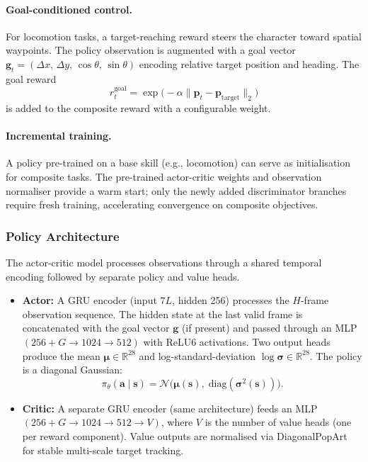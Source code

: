\paragraph{Goal-conditioned control.}
For locomotion tasks, a target-reaching reward steers the character toward spatial waypoints. The policy observation is augmented with a goal vector $\mathbf{g}_t = (\Delta x,\, \Delta y,\, \cos\theta,\, \sin\theta)$ encoding relative target position and heading. The goal reward
\[
    r_t^{\mathrm{goal}} = \exp\bigl(-\alpha \|\mathbf{p}_t - \mathbf{p}_{\mathrm{target}}\|_2\bigr)
\]
is added to the composite reward with a configurable weight.

\paragraph{Incremental training.}
A policy pre-trained on a base skill (e.g., locomotion) can serve as initialisation for composite tasks. The pre-trained actor-critic weights and observation normaliser provide a warm start; only the newly added discriminator branches require fresh training, accelerating convergence on composite objectives.


\subsubsection{Policy Architecture}
\label{sec:policy}

The actor-critic model processes observations through a shared temporal encoding followed by separate policy and value heads.

\begin{itemize}
    \item \textbf{Actor:} A GRU encoder (input $7L$, hidden 256) processes the $H$-frame observation sequence. The hidden state at the last valid frame is concatenated with the goal vector $\mathbf{g}$ (if present) and passed through an MLP $(256{+}G \to 1024 \to 512)$ with ReLU6 activations. Two output heads produce the mean $\boldsymbol{\mu} \in \mathbb{R}^{28}$ and log-standard-deviation $\log\boldsymbol{\sigma} \in \mathbb{R}^{28}$. The policy is a diagonal Gaussian:
    \[
        \pi_\theta(\mathbf{a} \mid \mathbf{s}) = \mathcal{N}\bigl(\boldsymbol{\mu}(\mathbf{s}),\; \mathrm{diag}(\boldsymbol{\sigma}^2(\mathbf{s}))\bigr).
    \]

    \item \textbf{Critic:} A separate GRU encoder (same architecture) feeds an MLP $(256{+}G \to 1024 \to 512 \to V)$, where $V$ is the number of value heads (one per reward component). Value outputs are normalised via DiagonalPopArt~\cite{ppo2017} for stable multi-scale target tracking.
\end{itemize}


